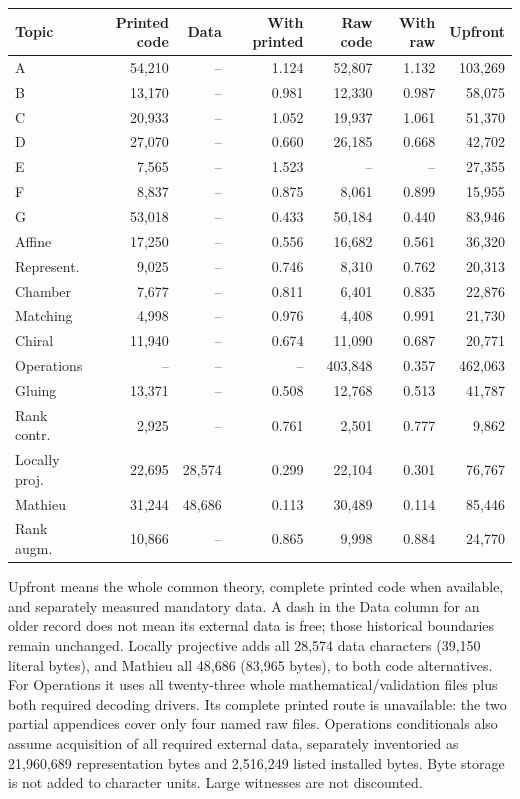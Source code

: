 \documentclass[11pt,a4paper]{article}
\newcommand{\tabsetup}{\small\setlength{\tabcolsep}{4pt}\renewcommand{\arraystretch}{1.10}}
\begin{document}
\begin{center}\tabsetup\begin{tabular}{lrrrrrr}\toprule
Topic & Printed code & Data & With printed & Raw code & With raw & Upfront\\\midrule
A & 54,210 & -- & 1.124 & 52,807 & 1.132 & 103,269 \\
B & 13,170 & -- & 0.981 & 12,330 & 0.987 & 58,075 \\
C & 20,933 & -- & 1.052 & 19,937 & 1.061 & 51,370 \\
D & 27,070 & -- & 0.660 & 26,185 & 0.668 & 42,702 \\
E & 7,565 & -- & 1.523 & -- & -- & 27,355 \\
F & 8,837 & -- & 0.875 & 8,061 & 0.899 & 15,955 \\
G & 53,018 & -- & 0.433 & 50,184 & 0.440 & 83,946 \\
Affine & 17,250 & -- & 0.556 & 16,682 & 0.561 & 36,320 \\
Represent. & 9,025 & -- & 0.746 & 8,310 & 0.762 & 20,313 \\
Chamber & 7,677 & -- & 0.811 & 6,401 & 0.835 & 22,876 \\
Matching & 4,998 & -- & 0.976 & 4,408 & 0.991 & 21,730 \\
Chiral & 11,940 & -- & 0.674 & 11,090 & 0.687 & 20,771 \\
Operations & -- & -- & -- & 403,848 & 0.357 & 462,063 \\
Gluing & 13,371 & -- & 0.508 & 12,768 & 0.513 & 41,787 \\
Rank contr. & 2,925 & -- & 0.761 & 2,501 & 0.777 & 9,862 \\
Locally proj. & 22,695 & 28,574 & 0.299 & 22,104 & 0.301 & 76,767 \\
Mathieu & 31,244 & 48,686 & 0.113 & 30,489 & 0.114 & 85,446 \\
Rank augm. & 10,866 & -- & 0.865 & 9,998 & 0.884 & 24,770 \\
\bottomrule\end{tabular}\end{center}
Upfront means the whole common theory, complete printed code when available, and separately measured mandatory data. A dash in the Data column for an older record does not mean its external data is free; those historical boundaries remain unchanged. Locally projective adds all 28,574 data characters (39,150 literal bytes), and Mathieu all 48,686 (83,965 bytes), to both code alternatives. For Operations it uses all twenty-three whole mathematical/validation files plus both required decoding drivers. Its complete printed route is unavailable: the two partial appendices cover only four named raw files. Operations conditionals also assume acquisition of all required external data, separately inventoried as 21,960,689 representation bytes and 2,516,249 listed installed bytes. Byte storage is not added to character units. Large witnesses are not discounted.
\end{document}
